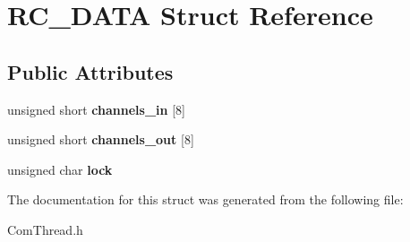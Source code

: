 \hypertarget{struct_r_c___d_a_t_a}{\section{R\-C\-\_\-\-D\-A\-T\-A Struct Reference}
\label{struct_r_c___d_a_t_a}
}
\subsection*{Public Attributes}
\begin{DoxyCompactItemize}
\item 
\hypertarget{struct_r_c___d_a_t_a_a5b5200df210a92ce80ff6b57d1e5a10a}{unsigned short {\bfseries channels\-\_\-in} \mbox{[}8\mbox{]}}\label{struct_r_c___d_a_t_a_a5b5200df210a92ce80ff6b57d1e5a10a}

\item 
\hypertarget{struct_r_c___d_a_t_a_a47baef8ffd03b7b84c15f1798e4bd95b}{unsigned short {\bfseries channels\-\_\-out} \mbox{[}8\mbox{]}}\label{struct_r_c___d_a_t_a_a47baef8ffd03b7b84c15f1798e4bd95b}

\item 
\hypertarget{struct_r_c___d_a_t_a_a93a4118f48b2655b1a5a1d21ddcd3a59}{unsigned char {\bfseries lock}}\label{struct_r_c___d_a_t_a_a93a4118f48b2655b1a5a1d21ddcd3a59}

\end{DoxyCompactItemize}


The documentation for this struct was generated from the following file\-:\begin{DoxyCompactItemize}
\item 
Com\-Thread.\-h\end{DoxyCompactItemize}
